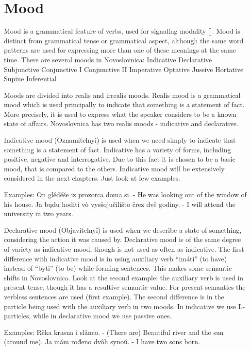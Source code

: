 \section{Mood}

Mood is a grammatical feature of verbs, used for signaling modality []. Mood is distinct from grammatical tense or grammatical aspect, although the same word patterns are used for expressing more than one of these meanings at the same time. There are several moods in Novoslovnica:
Indicative
Declarative
Subjunctive
Conjunctive I
Conjunctive II
Imperative
Optative
Jussive
Hortative
Supine
Inferential

Moods are divided into realis and irrealis moods. Realis mood is a grammatical mood which is used principally to indicate that something is a statement of fact. More precisely, it is used to express what the speaker considers to be a known state of affairs. Novoslovnica has two realis moods - indicative and declarative.

Indicative mood (Oznamitelnyǐ)  is used when we need simply to indicate that something is a statement of fact. Indicative has a variety of forms, including positive, negative and interrogative. Due to this fact it is chosen to be a basic mood, that is compared to the others. Indicative mood will be extensively considered in the next chapters. Just look at few examples.

Examples:
On glěděše iz prozorca doma si. - He was looking out of the window of his house.
Ja bųdu hoditi vò vysšojučilišto črez dvě godiny. - I will attend the university in two years.

Declarative mood (Objavitelnyǐ) is used when we describe a state of something, considering the action it was caused by. Declarative mood is of the same degree of variety as indicative mood, though is not used as often as indicative.
The first difference with indicative mood is in using auxiliary verb “imáti” (to have) instead of “byti” (to be) while forming sentences. This makes some semantic shifts in Novoslovnica. Look at the second example: the auxiliary verb is used in present tense, though it has a resultive semantic value. For present semantics the verbless sentences are used (first example).
The second difference is in the particle being used with the auxiliary verb in two moods. In indicative we use L-particles, while in declarative mood we use passive ones.

Examples:
Rěka krasna i slånco. - (There are) Beautiful river and the sun (around me).
Ja mám rođeno dvôh synoŭ. - I have two sons born.

